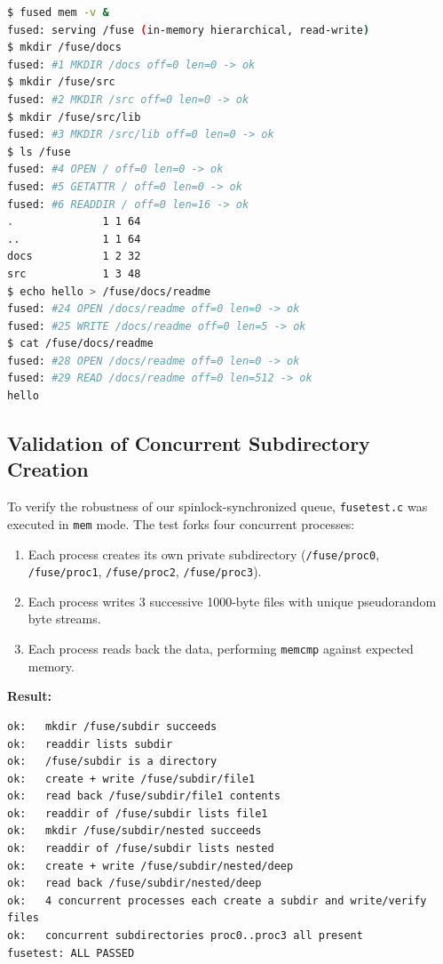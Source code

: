 \documentclass[11pt,a4paper]{article}
\begin{document}
\begin{lstlisting}[language=bash, caption={Terminal Trace of Hierarchical Directory Operations}]
$ fused mem -v &
fused: serving /fuse (in-memory hierarchical, read-write)
$ mkdir /fuse/docs
fused: #1 MKDIR /docs off=0 len=0 -> ok
$ mkdir /fuse/src
fused: #2 MKDIR /src off=0 len=0 -> ok
$ mkdir /fuse/src/lib
fused: #3 MKDIR /src/lib off=0 len=0 -> ok
$ ls /fuse
fused: #4 OPEN / off=0 len=0 -> ok
fused: #5 GETATTR / off=0 len=0 -> ok
fused: #6 READDIR / off=0 len=16 -> ok
.              1 1 64
..             1 1 64
docs           1 2 32
src            1 3 48
$ echo hello > /fuse/docs/readme
fused: #24 OPEN /docs/readme off=0 len=0 -> ok
fused: #25 WRITE /docs/readme off=0 len=5 -> ok
$ cat /fuse/docs/readme
fused: #28 OPEN /docs/readme off=0 len=0 -> ok
fused: #29 READ /docs/readme off=0 len=512 -> ok
hello
\end{lstlisting}

\subsection{Validation of Concurrent Subdirectory Creation}
To verify the robustness of our spinlock-synchronized queue, \texttt{fusetest.c} was executed in \texttt{mem} mode. The test forks four concurrent processes:
\begin{enumerate}[noitemsep]
    \item Each process creates its own private subdirectory (\texttt{/fuse/proc0}, \texttt{/fuse/proc1}, \texttt{/fuse/proc2}, \texttt{/fuse/proc3}).
    \item Each process writes 3 successive 1000-byte files with unique pseudorandom byte streams.
    \item Each process reads back the data, performing \texttt{memcmp} against expected memory.
\end{enumerate}

\textbf{Result:}
\begin{lstlisting}[language=text]
ok:   mkdir /fuse/subdir succeeds
ok:   readdir lists subdir
ok:   /fuse/subdir is a directory
ok:   create + write /fuse/subdir/file1
ok:   read back /fuse/subdir/file1 contents
ok:   readdir of /fuse/subdir lists file1
ok:   mkdir /fuse/subdir/nested succeeds
ok:   readdir of /fuse/subdir lists nested
ok:   create + write /fuse/subdir/nested/deep
ok:   read back /fuse/subdir/nested/deep
ok:   4 concurrent processes each create a subdir and write/verify files
ok:   concurrent subdirectories proc0..proc3 all present
fusetest: ALL PASSED
\end{lstlisting}
\end{document}

